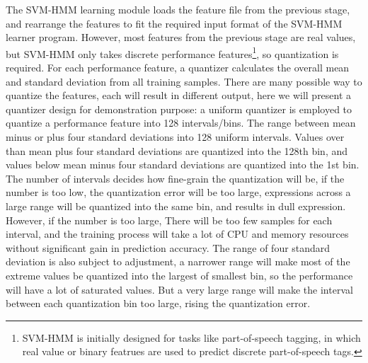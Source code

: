 The SVM-HMM learning module loads the feature file from the previous stage, and rearrange the features to fit the required input format of the SVM-HMM learner program. However, most features from the previous stage are real values, but SVM-HMM only takes discrete performance features\footnote{SVM-HMM is initially designed for tasks like part-of-speech tagging, in which real value or binary featrues are used to predict discrete part-of-speech tags.}, so quantization is required. For each performance feature, a quantizer calculates the overall mean and standard deviation from all training samples. There are many possible way to quantize the features, each will result in different output, here we will present a quantizer design for demonstration purpose: a uniform quantizer is employed to quantize a performance feature into 128 intervals/bins. The range between mean minus or plus four standard deviations into 128 uniform intervals. Values over than mean plus four standard deviations are quantized into the 128th bin, and values below mean minus four standard deviations are quantized into the 1st bin.  The number of intervals decides how fine-grain the quantization will be, if the number is too low, the quantization error will be too large, expressions across a large range will be quantized into the same bin, and results in dull expression. However, if the number is too large, There will be too few samples for each interval, and the training process will take a lot of CPU and memory resources without significant gain in prediction accuracy. The range of four standard deviation is also subject to adjustment, a narrower range will make most of the extreme values be quantized into the largest of smallest bin, so the performance will have a lot of saturated values. But a very large range will make the interval between each quantization bin too large, rising the quantization error. %

